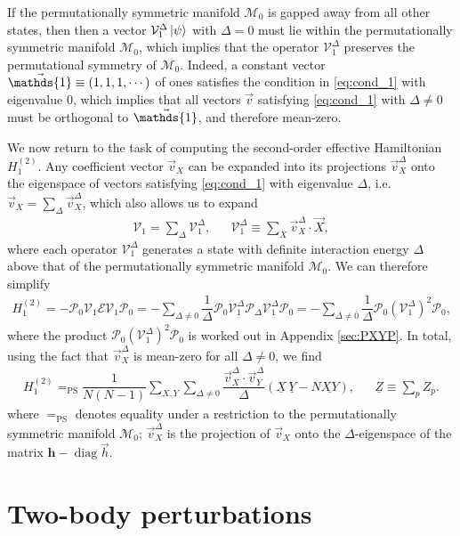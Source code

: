 \documentclass[nofootinbib,notitlepage,11pt]{revtex4-2}
\newcommand{\f}[2]{\dfrac{#1}{#2}} %
\newcommand{\p}[1]{\left(#1\right)} %
\renewcommand{\c}{\cdot} %
\newcommand{\m}{\bm} %
\renewcommand{\v}{\vec} %
\newcommand{\1}{\mathds{1}}
\newcommand{\E}{\mathcal{E}}
\newcommand{\M}{\mathcal{M}}
\renewcommand{\P}{\mathcal{P}}
\newcommand{\V}{\mathcal{V}}
\newcommand{\EQPS}{=_{\text{PS}}}
\newcommand{\col}{\underline}
\DeclareMathOperator{\diag}{diag}
\begin{document}
If the permutationally symmetric manifold $\M_0$ is gapped away from
all other states, then then a vector $\V_1^\Delta\ket\psi$ with
$\Delta=0$ must lie within the permutationally symmetric manifold
$\M_0$, which implies that the operator $\V_1^\Delta$ preserves the
permutational symmetry of $\M_0$.  Indeed, a constant vector
$\v\1\equiv\p{1,1,1,\cdots}$ of ones satisfies the condition in
\eqref{eq:cond_1} with eigenvalue $0$, which implies that all vectors
$\v v$ satisfying \eqref{eq:cond_1} with $\Delta\ne0$ must be
orthogonal to $\v\1$, and therefore mean-zero.

We now return to the task of computing the second-order effective
Hamiltonian $H_1^{(2)}$.  Any coefficient vector $\v v_X$ can be
expanded into its projections $\v v_X^\Delta$ onto the eigenspace of
vectors satisfying \eqref{eq:cond_1} with eigenvalue $\Delta$,
i.e.~$\v v_X = \sum_\Delta \v v_X^\Delta$, which also allows us to
expand
\begin{align}
  \V_1 = \sum_\Delta \V_1^\Delta,
  &&
  \V_1^\Delta \equiv \sum_X \v v_X^\Delta \c \v X,
\end{align}
where each operator $\V_1^\Delta$ generates a state with definite
interaction energy $\Delta$ above that of the permutationally
symmetric manifold $\M_0$.  We can therefore simplify
\begin{align}
  H_1^{(2)}
  = - \P_0 \V_1 \E \V_1 \P_0
  = - \sum_{\Delta\ne0} \f1{\Delta}
  \P_0 \V_1^\Delta \P_\Delta \V_1^\Delta \P_0
  = - \sum_{\Delta\ne0} \f1{\Delta} \P_0 \p{\V_1^\Delta}^2 \P_0,
\end{align}
where the product $\P_0 \p{\V_1^\Delta}^2 \P_0$ is worked out in
Appendix \ref{sec:PXYP}.  In total, using the fact that
$\v v_X^\Delta$ is mean-zero for all $\Delta\ne0$, we find
\begin{align}
  H_1^{(2)}
  \EQPS \f1{N\p{N-1}} \sum_{X,Y} \sum_{\Delta\ne0}
  \f{\v v_X^\Delta\c\v v_Y^\Delta}{\Delta}
  \p{\col{X}\,\col{Y} - N \col{XY}},
  &&
  \col{Z} \equiv \sum_p Z_p.
  \label{eq:H_1_2}
\end{align}
where $\EQPS$ denotes equality under a restriction to the
permutationally symmetric manifold $\M_0$; $\v v_X^\Delta$ is the
projection of $\v v_X$ onto the $\Delta$-eigenspace of the matrix
$\m h-\diag\v h$.

\section{Two-body perturbations}
\label{sec:two_body_pert}
\end{document}
